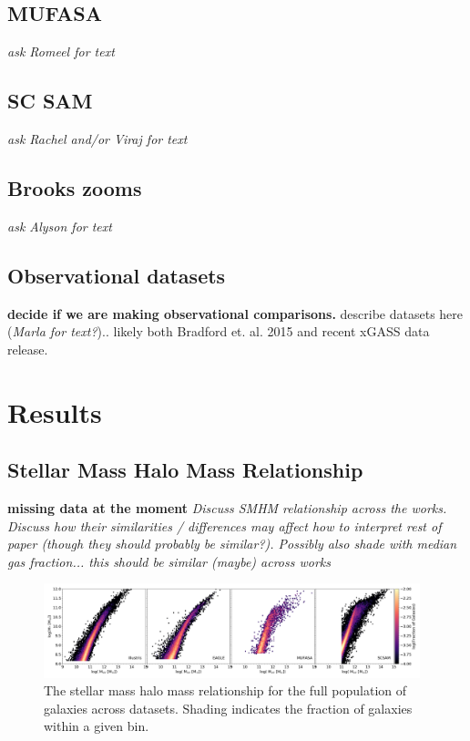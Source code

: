 \documentclass[fleqn,usenatbib]{mnras}
\begin{document}
\subsection{MUFASA}
\label{sec:MUFASA method}
{\it ask Romeel for text}

\subsection{SC SAM}
\label{sec:SC-SAM method}
{\it ask Rachel and/or Viraj for text}

\subsection{Brooks zooms}
\label{sec:Brooks method}
{\it ask Alyson for text}

\subsection{Observational datasets}
\label{sec:observational data}
{\bf decide if we are making observational comparisons.} describe datasets here ({\it Marla for text?}).. likely both Bradford et. al. 2015 and recent xGASS data release.

\section{Results}
\label{sec:results}

\subsection{Stellar Mass Halo Mass Relationship}
\label{sec:results:SMHM}
{\bf missing data at the moment}
{\it Discuss SMHM relationship across the works. Discuss how their similarities / differences may affect how to interpret rest of paper (though they should probably be similar?).  Possibly also shade with median gas fraction... this should be similar (maybe) across works}

\begin{figure}
\includegraphics[width = 0.975\textwidth]{halo_stellar_2D_fraction.png}
\caption{The stellar mass halo mass relationship for the full population of galaxies across datasets. Shading indicates the fraction of galaxies within a given bin.}
\label{fig:fgas mstar 2D}
\end{figure}
\end{document}
